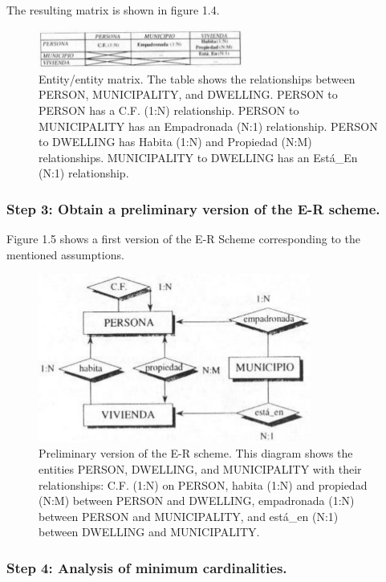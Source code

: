 \documentclass{article}
\begin{document}
The resulting matrix is shown in figure 1.4.

\begin{figure}
    \centering
    \includegraphics[width=0.6\textwidth]{figures/fig4}
    \caption{Entity/entity matrix. The table shows the relationships between PERSON, MUNICIPALITY, and DWELLING. PERSON to PERSON has a C.F. (1:N) relationship. PERSON to MUNICIPALITY has an Empadronada (N:1) relationship. PERSON to DWELLING has Habita (1:N) and Propiedad (N:M) relationships. MUNICIPALITY to DWELLING has an Está\_En (N:1) relationship.}
    \label{fig:fig1.4}
\end{figure}

\subsubsection*{Step 3: Obtain a preliminary version of the E-R scheme.}

Figure 1.5 shows a first version of the E-R Scheme corresponding to the mentioned assumptions.

\begin{figure}
    \centering
    \includegraphics[width=0.8\textwidth]{figures/fig5}
    \caption{Preliminary version of the E-R scheme. This diagram shows the entities PERSON, DWELLING, and MUNICIPALITY with their relationships: C.F. (1:N) on PERSON, habita (1:N) and propiedad (N:M) between PERSON and DWELLING, empadronada (1:N) between PERSON and MUNICIPALITY, and está\_en (N:1) between DWELLING and MUNICIPALITY.}
    \label{fig:fig1.5}
\end{figure}

\subsubsection*{Step 4: Analysis of minimum cardinalities.}
\end{document}

